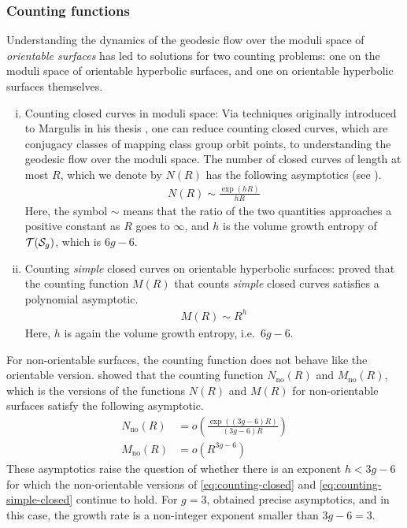 \subsubsection*{Counting functions}

Understanding the dynamics of the geodesic flow over the moduli space of \emph{orientable surfaces} has led to solutions for two counting problems: one on the moduli space of orientable hyperbolic surfaces, and one on orientable hyperbolic surfaces themselves.

\begin{enumerate}[(i)]
\item Counting closed curves in moduli space: Via techniques originally introduced to Margulis in his thesis \cite{margulis2004some}, one can reduce counting closed curves, which are conjugacy classes of mapping class group orbit points, to understanding the geodesic flow over the moduli space.
  The number of closed curves of length at most $R$, which we denote by $N(R)$ has the following asymptotics (see \cite{eskinmirzakhani}).
  \begin{align}
    \label{eq:counting-closed}
    N(R) \sim \frac{\exp(hR)}{hR}
  \end{align}
  Here, the symbol $\sim$ means that the ratio of the two quantities approaches a positive constant as $R$ goes to $\infty$, and $h$ is the volume growth entropy of $\mathcal{T}(\mathcal{S}_{g})$, which is $6g-6$.
\item Counting \emph{simple} closed curves on orientable hyperbolic surfaces: \textcite{mirzakhani2008growth} proved that the counting function $M(R)$ that counts \emph{simple} closed curves satisfies a polynomial asymptotic.
  \begin{align}
    \label{eq:counting-simple-closed}
    M(R) \sim R^{h}
  \end{align}
  Here, $h$ is again the volume growth entropy, i.e.\ $6g-6$.
\end{enumerate}

For non-orientable surfaces, the counting function does not behave like the orientable version.
\textcite{gendulphe2017whats} showed that the counting function $N_{\mathrm{no}}(R)$ and $M_{\mathrm{no}}(R)$, which is the versions of the functions $N(R)$ and $M(R)$ for non-orientable surfaces satisfy the following asymptotic.
\begin{align*}
  N_{\mathrm{no}}(R) &= o\left( \frac{\exp((3g-6)R)}{(3g-6)R} \right) \\
  M_{\mathrm{no}}(R) &= o(R^{3g-6})
\end{align*}
These asymptotics raise the question of whether there is an exponent $h < 3g-6$ for which the non-orientable versions of \eqref{eq:counting-closed} and \eqref{eq:counting-simple-closed} continue to hold.
For $g = 3$, \textcite{10.1093/imrn/rny112} obtained precise asymptotics, and in this case, the growth rate is a non-integer exponent smaller than $3g - 6 = 3$.

